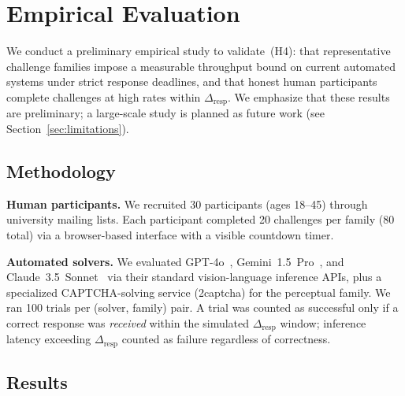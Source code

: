 \documentclass[11pt]{article}
\theoremstyle{remark}
\theoremstyle{plain}
\begin{document}
	
	\section{Empirical Evaluation}
	\label{sec:eval}
	
	We conduct a preliminary empirical study to validate~(H4): that
	representative challenge families impose a measurable throughput bound
	on current automated systems under strict response deadlines, and that
	honest human participants complete challenges at high rates within
	$\Delta_{\mathrm{resp}}$. We emphasize that these results are preliminary;
	a large-scale study is planned as future work
	(see Section~\ref{sec:limitations}).
	
	\subsection{Methodology}
	
	\noindent\textbf{Human participants.}
	We recruited 30 participants (ages 18--45) through university mailing
	lists. Each participant completed 20 challenges per family (80 total)
	via a browser-based interface with a visible countdown timer.
	
	\noindent\textbf{Automated solvers.}
	We evaluated GPT-4o~\cite{openai2023gpt4}, Gemini~1.5~Pro~\cite{geminiteam2023},
	and Claude~3.5~Sonnet~\cite{anthropic2024claude} via their standard
	vision-language inference APIs, plus a specialized CAPTCHA-solving
	service (2captcha) for the perceptual family. We ran 100 trials per
	(solver, family) pair. A trial was counted as successful only if a
	correct response was \emph{received} within the simulated
	$\Delta_{\mathrm{resp}}$ window; inference latency exceeding
	$\Delta_{\mathrm{resp}}$ counted as failure regardless of correctness.
	
	\subsection{Results}
	
\end{document}
